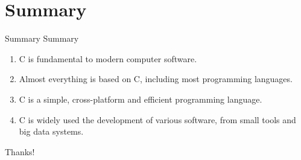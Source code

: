 \documentclass[UTF8]{beamer}
\begin{document}
\section*{Summary}
\begin{frame}[t]{Summary}
    Summary
\begin{enumerate}
    \item C is fundamental to modern computer software.
    \item Almost everything is based on C, including most programming languages.
    \item C is a simple, cross-platform and efficient programming language.
    \item C is widely used the development of various software, from small tools and big data systems.
\end{enumerate}
\end{frame}
\begin{frame}
  \centerline{\Huge{Thanks!}}
\end{frame}
\end{document}
